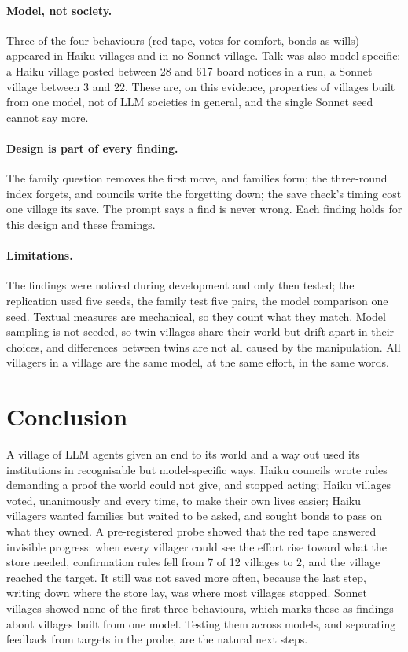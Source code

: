 \documentclass[11pt]{article}
\begin{document}
\paragraph{Model, not society.} Three of the four behaviours (red tape, votes for comfort, bonds as
wills) appeared in Haiku villages and in no Sonnet village. Talk was also model-specific: a Haiku
village posted between 28 and 617 board notices in a run, a Sonnet village between 3 and 22. These are, on this
evidence, properties of villages built from one model, not of LLM societies in general, and the
single Sonnet seed cannot say more.

\paragraph{Design is part of every finding.} The family question removes the first move, and families
form; the three-round index forgets, and councils write the forgetting down; the save check's timing
cost one village its save. The prompt says a find is never wrong. Each finding holds for this design
and these framings.

\paragraph{Limitations.} The findings were noticed during development and only then tested; the
replication used five seeds, the family test five pairs, the model comparison one seed. Textual
measures are mechanical, so they count what they match. Model sampling is not seeded, so twin villages
share their world but drift apart in their choices, and differences between twins are not all caused
by the manipulation. All villagers in a village are the same model, at the same effort, in the same
words.

\section{Conclusion}

A village of LLM agents given an end to its world and a way out used its institutions in
recognisable but model-specific ways. Haiku councils wrote rules demanding a proof the world could not
give, and stopped acting; Haiku villages voted, unanimously and every time, to make their own lives
easier; Haiku villagers wanted families but waited to be asked, and sought bonds to pass on what they
owned. A pre-registered probe showed that the red tape answered invisible progress: when every
villager could see the effort rise toward what the store needed, confirmation rules fell from 7 of 12
villages to 2, and the village reached the target. It still was not saved more often, because the
last step, writing down where the store lay, was where most villages stopped. Sonnet villages showed
none of the first three behaviours, which marks these as findings about villages built from one model.
Testing them across models, and separating feedback from targets in the probe, are the natural next
steps.
\end{document}
